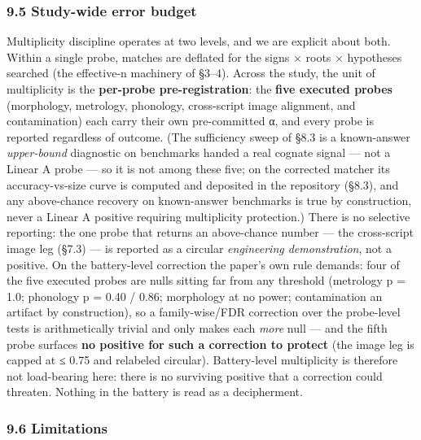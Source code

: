 \documentclass[
  10pt,
]{article}
\begin{document}
\hypertarget{study-wide-error-budget}{%
\subsubsection{9.5 Study-wide error
budget}\label{study-wide-error-budget}}

Multiplicity discipline operates at two levels, and we are explicit
about both. Within a single probe, matches are deflated for the signs ×
roots × hypotheses searched (the effective-n machinery of §3--4). Across
the study, the unit of multiplicity is the \textbf{per-probe
pre-registration}: the \textbf{five executed probes} (morphology,
metrology, phonology, cross-script image alignment, and contamination)
each carry their own pre-committed α, and every probe is reported
regardless of outcome. (The sufficiency sweep of §8.3 is a known-answer
\emph{upper-bound} diagnostic on benchmarks handed a real cognate signal
--- not a Linear A probe --- so it is not among these five; on the
corrected matcher its accuracy-vs-size curve is computed and deposited
in the repository (§8.3), and any above-chance recovery on known-answer
benchmarks is true by construction, never a Linear A positive requiring
multiplicity protection.) There is no selective reporting: the one probe
that returns an above-chance number --- the cross-script image leg
(§7.3) --- is reported as a circular \emph{engineering demonstration},
not a positive. On the battery-level correction the paper's own rule
demands: four of the five executed probes are nulls sitting far from any
threshold (metrology p = 1.0; phonology p = 0.40 / 0.86; morphology at
no power; contamination an artifact by construction), so a
family-wise/FDR correction over the probe-level tests is arithmetically
trivial and only makes each \emph{more} null --- and the fifth probe
surfaces \textbf{no positive for such a correction to protect} (the
image leg is capped at ≤ 0.75 and relabeled circular). Battery-level
multiplicity is therefore not load-bearing here: there is no surviving
positive that a correction could threaten. Nothing in the battery is
read as a decipherment.

\hypertarget{limitations}{%
\subsubsection{9.6 Limitations}\label{limitations}}
\end{document}
